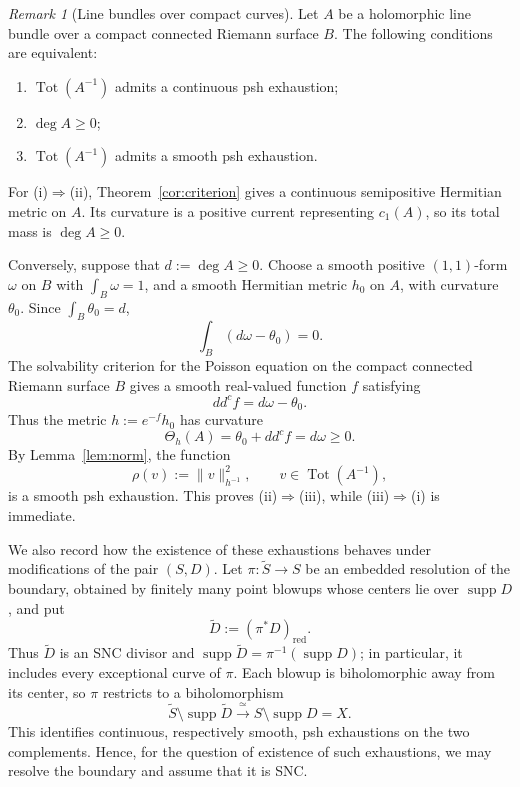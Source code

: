 \documentclass[11pt]{amsart}
\theoremstyle{definition}
\theoremstyle{remark}
\newtheorem{remark}{Remark}[section]
\numberwithin{equation}{section}
\newcommand{\Tot}{\operatorname{Tot}}
\newcommand{\ddc}{dd^c}
\newcommand{\supp}{\operatorname{supp}}
\begin{document}
\begin{remark}[Line bundles over compact curves]
\label{cor:curve-total-space}
Let $A$ be a holomorphic line bundle over a compact
connected Riemann surface $B$. The following conditions are equivalent:
\begin{enumerate}[label=\textup{(\roman*)},leftmargin=2.5em]
\item $\Tot(A^{-1})$ admits a continuous psh exhaustion;
\item $\deg A\ge0$;
\item $\Tot(A^{-1})$ admits a smooth psh exhaustion.
\end{enumerate}

For \textup{(i)}$\Rightarrow$\textup{(ii)},
Theorem~\ref{cor:criterion} gives a continuous semipositive
Hermitian metric on $A$. Its curvature is a positive current
representing $c_1(A)$, so its total mass is $\deg A\ge0$.

Conversely, suppose that $d:=\deg A\ge0$. Choose a smooth
positive $(1,1)$-form $\omega$ on $B$ with
$\int_B\omega=1$, and a smooth Hermitian metric $h_0$ on $A$,
with curvature $\theta_0$. Since $\int_B\theta_0=d$,
\[
  \int_B(d\omega-\theta_0)=0.
\]
The solvability criterion for the Poisson equation on the
compact connected Riemann surface $B$ gives a smooth
real-valued function $f$ satisfying
\[
  \ddc f=d\omega-\theta_0.
\]
Thus the metric $h:=e^{-f}h_0$ has curvature
\[
  \Theta_h(A)=\theta_0+\ddc f=d\omega\ge0.
\]
By Lemma~\ref{lem:norm}, the function
\[
  \rho(v):=\|v\|_{h^{-1}}^2,
  \qquad v\in\Tot(A^{-1}),
\]
is a smooth psh exhaustion. This proves
\textup{(ii)}$\Rightarrow$\textup{(iii)}, while
\textup{(iii)}$\Rightarrow$\textup{(i)} is immediate.
\end{remark}

We also record how the existence of these exhaustions
behaves under modifications of the pair $(S,D)$.
Let $\pi:\widetilde S\to S$ be an embedded resolution of
the boundary, obtained by finitely many point blowups whose
centers lie over $\supp D$, and put
\[
  \widetilde D:=(\pi^*D)_{\mathrm{red}}.
\]
Thus $\widetilde D$ is an SNC divisor and
$\supp\widetilde D=\pi^{-1}(\supp D)$; in particular,
it includes every exceptional curve of $\pi$.
Each blowup is biholomorphic away from its center, so
$\pi$ restricts to a biholomorphism
\[
  \widetilde S\setminus\supp\widetilde D
  \xrightarrow{\ \simeq\ }S\setminus\supp D=X.
\]
This identifies continuous, respectively smooth, psh
exhaustions on the two complements. Hence, for the question
of existence of such exhaustions, we may resolve the
boundary and assume that it is SNC.
\end{document}
